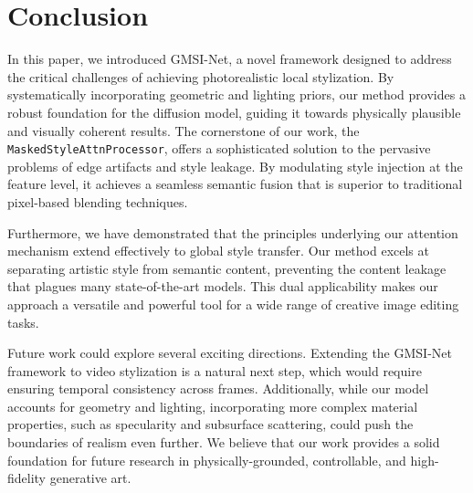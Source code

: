 \section{Conclusion}

In this paper, we introduced GMSI-Net, a novel framework designed to address the critical challenges of achieving photorealistic local stylization. By systematically incorporating geometric and lighting priors, our method provides a robust foundation for the diffusion model, guiding it towards physically plausible and visually coherent results. The cornerstone of our work, the \texttt{MaskedStyleAttnProcessor}, offers a sophisticated solution to the pervasive problems of edge artifacts and style leakage. By modulating style injection at the feature level, it achieves a seamless semantic fusion that is superior to traditional pixel-based blending techniques.

Furthermore, we have demonstrated that the principles underlying our attention mechanism extend effectively to global style transfer. Our method excels at separating artistic style from semantic content, preventing the content leakage that plagues many state-of-the-art models. This dual applicability makes our approach a versatile and powerful tool for a wide range of creative image editing tasks.

Future work could explore several exciting directions. Extending the GMSI-Net framework to video stylization is a natural next step, which would require ensuring temporal consistency across frames. Additionally, while our model accounts for geometry and lighting, incorporating more complex material properties, such as specularity and subsurface scattering, could push the boundaries of realism even further. We believe that our work provides a solid foundation for future research in physically-grounded, controllable, and high-fidelity generative art.